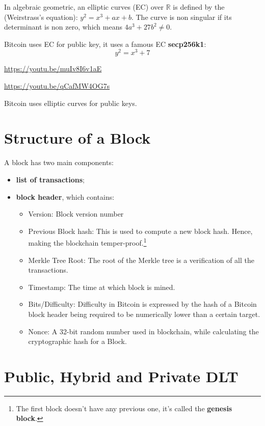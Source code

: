 In algebraic geometric, an elliptic curves (EC) over $\mathbb{R}$ is defined by the (Weirstrass’s equation): $y^{2} =x^{3} +ax+b$. The curve is non singular if its determinant is non zero, which means $4a^{3} +27b^{2} \neq 0$.

Bitcoin uses EC for public key, it uses a famous EC \textbf{secp256k1}:
\begin{equation*}
	y^{2} =x^{3} +7
\end{equation*}

\url{https://youtu.be/muIv8I6v1aE}

\url{https://youtu.be/qCafMW4OG7s}

Bitcoin uses elliptic curves for public keys.
\section{Structure of a Block}

A block has two main components:
\begin{itemize}
	\item \textbf{list of transactions};
	\item \textbf{block header}, which contains:
	      \begin{itemize}
	      	\item Version: Block version number
	      	\item Previous Block hash: This is used to compute a new block hash. Hence, making the blockchain temper-proof.\footnote{The first block doesn't have any previous one, it's called the \textbf{genesis block}.}
	      	\item Merkle Tree Root: The root of the Merkle tree is a verification of all the transactions.
	      	\item Timestamp: The time at which block is mined.
	      	\item Bits/Difficulty: Difficulty in Bitcoin is expressed by the hash of a Bitcoin block header being required to be numerically lower than a certain target.
	      	\item Nonce: A 32-bit random number used in blockchain, while calculating the cryptographic hash for a Block.
	      \end{itemize}
\end{itemize}

\section{Public, Hybrid and Private DLT}

